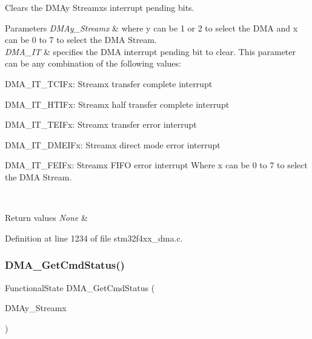 Clears the D\+M\+Ay Streamx\textquotesingle{}s interrupt pending bits. 


\begin{DoxyParams}{Parameters}
{\em D\+M\+Ay\+\_\+\+Streamx} & where y can be 1 or 2 to select the D\+MA and x can be 0 to 7 to select the D\+MA Stream. \\
\hline
{\em D\+M\+A\+\_\+\+IT} & specifies the D\+MA interrupt pending bit to clear. This parameter can be any combination of the following values\+: \begin{DoxyItemize}
\item D\+M\+A\+\_\+\+I\+T\+\_\+\+T\+C\+I\+Fx\+: Streamx transfer complete interrupt \item D\+M\+A\+\_\+\+I\+T\+\_\+\+H\+T\+I\+Fx\+: Streamx half transfer complete interrupt \item D\+M\+A\+\_\+\+I\+T\+\_\+\+T\+E\+I\+Fx\+: Streamx transfer error interrupt \item D\+M\+A\+\_\+\+I\+T\+\_\+\+D\+M\+E\+I\+Fx\+: Streamx direct mode error interrupt \item D\+M\+A\+\_\+\+I\+T\+\_\+\+F\+E\+I\+Fx\+: Streamx F\+I\+FO error interrupt Where x can be 0 to 7 to select the D\+MA Stream. \end{DoxyItemize}
\\
\hline
\end{DoxyParams}

\begin{DoxyRetVals}{Return values}
{\em None} & \\
\hline
\end{DoxyRetVals}


Definition at line 1234 of file stm32f4xx\+\_\+dma.\+c.

\mbox{\label{group___d_m_a___group4_gaa4d631cdd6cd020106435f30c0c6fb15}} 
\subsubsection{\texorpdfstring{D\+M\+A\+\_\+\+Get\+Cmd\+Status()}{DMA\_GetCmdStatus()}}
{\footnotesize\ttfamily Functional\+State D\+M\+A\+\_\+\+Get\+Cmd\+Status (\begin{DoxyParamCaption}\item[{\hyperlink{struct_d_m_a___stream___type_def}{D\+M\+A\+\_\+\+Stream\+\_\+\+Type\+Def} $\ast$}]{D\+M\+Ay\+\_\+\+Streamx }\end{DoxyParamCaption})}



